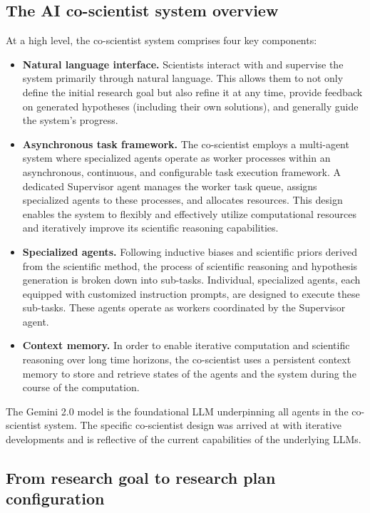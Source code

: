 \subsection{The AI co-scientist system overview}

At a high level, the co-scientist system comprises four key components:
\begin{itemize}
    \item \textbf{Natural language interface.} Scientists interact with and supervise the system primarily through natural language.  This allows them to not only define the initial research goal but also refine it at any time, provide feedback on generated hypotheses (including their own solutions), and generally guide the system's progress.
    \item \textbf{Asynchronous task framework.} The co-scientist employs a multi-agent system where specialized agents operate as worker processes within an asynchronous, continuous, and configurable task execution framework. A dedicated Supervisor agent manages the worker task queue, assigns specialized agents to these processes, and allocates resources. This design enables the system to flexibly and effectively utilize computational resources and iteratively improve its scientific reasoning capabilities.
    \item \textbf{Specialized agents.} Following inductive biases and scientific priors derived from the scientific method, the process of scientific reasoning and hypothesis generation is broken down into sub-tasks.  Individual, specialized agents, each equipped with customized instruction prompts, are designed to execute these sub-tasks.  These agents operate as workers coordinated by the Supervisor agent.
    \item \textbf{Context memory.} In order to enable iterative computation and scientific reasoning over long time horizons, the co-scientist uses a persistent context memory to store and retrieve states of the agents and the system during the course of the computation.
\end{itemize}

The Gemini 2.0 model is the foundational LLM underpinning all agents in the co-scientist system. The specific co-scientist design was arrived at with iterative developments and is reflective of the current capabilities of the underlying LLMs.

\subsection{From research goal to research plan configuration}

